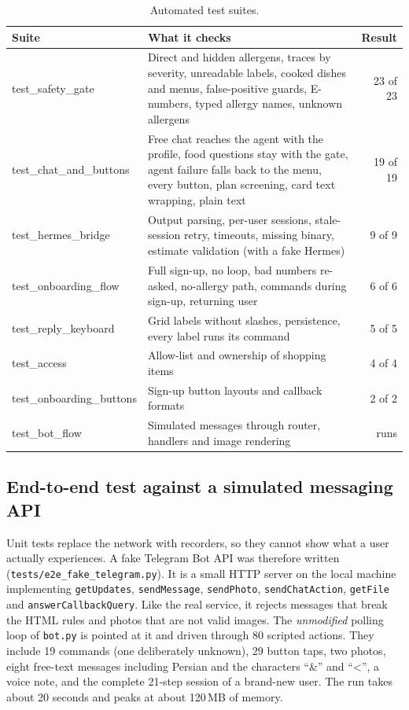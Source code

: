 \documentclass[11pt,a4paper]{article}
\begin{document}
\begin{table}[H]
\centering\small
\caption{Automated test suites.}
\label{tab:tests}
\begin{tabularx}{\textwidth}{@{}l Y r@{}}
\toprule
Suite & What it checks & Result \\
\midrule
test\_safety\_gate & Direct and hidden allergens, traces by severity, unreadable labels, cooked dishes and
  menus, false-positive guards, E-numbers, typed allergy names, unknown allergens & 23 of 23 \\
test\_chat\_and\_buttons & Free chat reaches the agent with the profile, food questions stay with the gate,
  agent failure falls back to the menu, every button, plan screening, card text wrapping, plain text & 19 of 19 \\
test\_hermes\_bridge & Output parsing, per-user sessions, stale-session retry, timeouts, missing binary,
  estimate validation (with a fake Hermes) & 9 of 9 \\
test\_onboarding\_flow & Full sign-up, no loop, bad numbers re-asked, no-allergy path, commands during
  sign-up, returning user & 6 of 6 \\
test\_reply\_keyboard & Grid labels without slashes, persistence, every label runs its command & 5 of 5 \\
test\_access & Allow-list and ownership of shopping items & 4 of 4 \\
test\_onboarding\_buttons & Sign-up button layouts and callback formats & 2 of 2 \\
test\_bot\_flow & Simulated messages through router, handlers and image rendering & runs \\
\bottomrule
\end{tabularx}
\end{table}

\subsection{End-to-end test against a simulated messaging API}

Unit tests replace the network with recorders, so they cannot show what a user actually experiences.
A fake Telegram Bot API was therefore written (\texttt{tests/e2e\_fake\_telegram.py}). It is a small
HTTP server on the local machine implementing \texttt{getUpdates}, \texttt{sendMessage},
\texttt{sendPhoto}, \texttt{sendChatAction}, \texttt{getFile} and \texttt{answerCallbackQuery}. Like the
real service, it rejects messages that break the HTML rules and photos that are not valid images. The
\emph{unmodified} polling loop of \texttt{bot.py} is pointed at it and driven through 80 scripted
actions. They include 19 commands (one deliberately unknown), 29 button taps, two photos, eight
free-text messages including Persian and the characters ``\&'' and ``<'', a voice note, and the
complete 21-step session of a brand-new user. The run takes about 20 seconds and peaks at about
120\,MB of memory.
\end{document}
